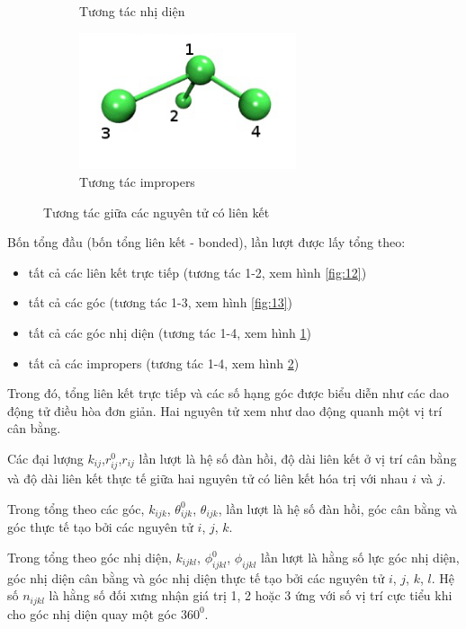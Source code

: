 \documentclass[12pt,a4paper,reqno, oneside]{book}
\begin{document}
\begin{figure}
\begin{subfigure}{0.5\textwidth}
		\caption{Tương tác nhị diện}
		\label{fig:14}
		\end{subfigure}
		\begin{subfigure}{0.5\textwidth}
		\includegraphics[width=0.7\textwidth,natwidth=610,natheight=642]{ff/impropers}
		\caption{Tương tác impropers}
		\label{fig:impropers}
		\end{subfigure}
		\caption{
		\label{fig:bond}%
		Tương tác giữa các nguyên tử có liên kết}
		\end{figure}
		Bốn tổng đầu (bốn tổng liên kết - bonded), lần lượt được lấy tổng theo:
		\begin{itemize}
		\item tất cả các liên kết trực tiếp (tương tác 1-2, xem hình \ref{fig:12})
		\item tất cả các góc (tương tác 1-3, xem hình \ref{fig:13})
		\item tất cả các góc nhị diện (tương tác 1-4, xem hình \ref{fig:14})
		\item tất cả các impropers (tương tác 1-4, xem hình \ref{fig:impropers})
		\end{itemize}
		Trong đó, tổng liên kết trực tiếp và các số hạng góc được biểu diễn như các dao động tử điều hòa đơn giản. Hai nguyên tử xem như dao động quanh một vị trí cân bằng.
		
		Các đại lượng $k_{ij}$,$r^{0}_{ij}$,$r_{ij}$ lần lượt là hệ số đàn hồi, độ dài liên kết ở vị trí cân bằng và độ dài liên kết thực tế giữa hai nguyên tử có liên kết hóa trị với nhau $i$ và $j$.
		
		Trong tổng theo các góc, $k_{ijk}$, $\theta^{0}_{ijk}$, $\theta_{ijk}$, lần lượt là hệ số đàn hồi, góc cân bằng và góc thực tế tạo bởi các nguyên tử $i $, $j $, $k $.
		
		Trong tổng theo góc nhị diện, $k_{ijkl}$, $\phi^{0}_{ijkl}$, $\phi_{ijkl}$ lần lượt là hằng số lực góc nhị diện, góc nhị diện cân bằng và góc nhị diện thực tế tạo bởi các nguyên tử $i$, $j$, $k$, $l$. Hệ số $n_{ijkl}$ là hằng số đối xưng nhận giá trị 1, 2 hoặc 3 ứng với số vị trí cực tiểu khi cho góc nhị diện quay một góc $360^{0}$.
		
\end{document}
